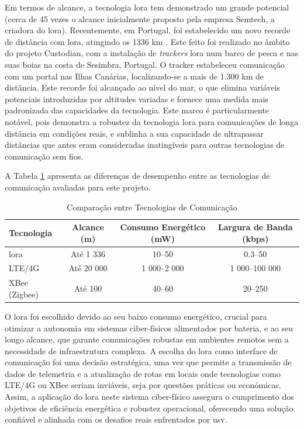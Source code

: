 Em termos de alcance, a tecnologia \gls{lora} tem demonstrado um grande potencial (cerca de 45 vezes o alcance inicialmente proposto pela empresa Semtech, a criadora do \gls{lora}). Recentemente, em Portugal, foi estabelecido um novo recorde de distância com \gls{lora}, atingindo os 1336 km \cite{pplware-lora}. Este feito foi realizado no âmbito do projeto Custodian, com a instalação de \emph{trackers} \gls{lora} num barco de pesca e nas suas boias na costa de Sesimbra, Portugal. O tracker estabeleceu comunicação com um portal nas Ilhas Canárias, localizando-se a mais de 1.300 km de distância. Este recorde foi alcançado ao nível do mar, o que elimina variáveis potenciais introduzidas por altitudes variadas e fornece uma medida mais padronizada das capacidades da tecnologia. Este marco é particularmente notável, pois demonstra a robustez da tecnologia \gls{lora} para comunicações de longa distância em condições reais, e sublinha a sua capacidade de ultrapassar distâncias que antes eram consideradas inatingíveis para outras tecnologias de comunicação sem fios.

A Tabela \ref{tab:comparacao_comunicacao} apresenta as diferenças de desempenho entre as tecnologias de comunicação avaliadas para este projeto.

\begin{table}[H]
    \centering
    \caption{Comparação entre Tecnologias de Comunicação}
    \label{tab:comparacao_comunicacao}
    \begin{tabular}{lccc}
        \textbf{Tecnologia} & \textbf{Alcance (m)} & \textbf{Consumo Energético (mW)} & \textbf{Largura de Banda (kbps)} \\ \hline 
        \gls{lora} & Até 1 336 & 10--50 & 0.3--50 \\ 
        LTE/4G & Até 20 000 & 1 000--2 000 & 1 000--100 000 \\ 
        XBee (Zigbee) & Até 100 & 40--60 & 20--250 \\
        \hline 
    \end{tabular}%
\end{table}

O \gls{lora} foi escolhido devido ao seu baixo consumo energético, crucial para otimizar a autonomia em sistemas ciber-físicos alimentados por bateria, e ao seu longo alcance, que garante comunicações robustas em ambientes remotos sem a necessidade de infraestrutura complexa. A escolha do \gls{lora} como interface de comunicação foi uma decisão estratégica, uma vez que permite a transmissão de dados de telemetria e a atualização de rotas em locais onde tecnologias como LTE/4G ou XBee seriam inviáveis, seja por questões práticas ou económicas. Assim, a aplicação do \gls{lora} neste sistema ciber-físico assegura o cumprimento dos objetivos de eficiência energética e robustez operacional, oferecendo uma solução confiável e alinhada com os desafios reais enfrentados por \gls{usv}.

